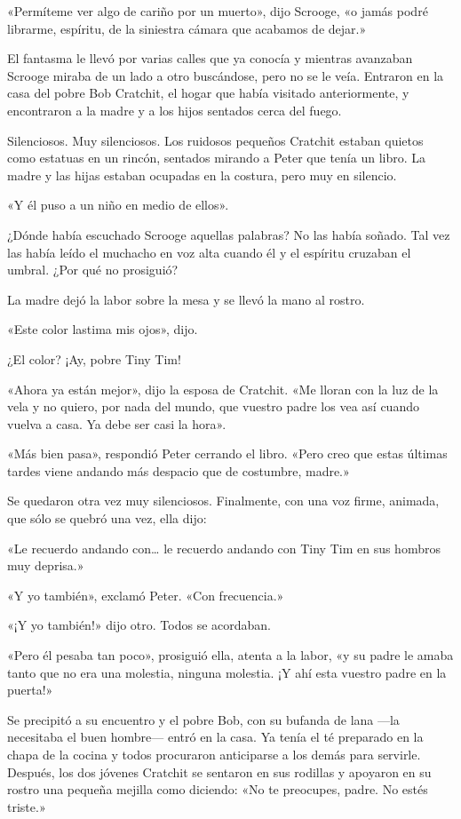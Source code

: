 \documentclass{novela}
\begin{document}
 «Permíteme ver algo de cariño por un muerto», dijo Scrooge, «o jamás podré librarme, espíritu, de la siniestra cámara que acabamos de dejar.»

 El fantasma le llevó por varias calles que ya conocía y mientras avanzaban Scrooge miraba de un lado a otro buscándose, pero no se le veía. Entraron en la casa del pobre Bob Cratchit, el hogar que había visitado anteriormente, y encontraron a la madre y a los hijos sentados cerca del fuego.

 Silenciosos. Muy silenciosos. Los ruidosos pequeños Cratchit estaban quietos como estatuas en un rincón, sentados mirando a Peter que tenía un libro. La madre y las hijas estaban ocupadas en la costura, pero muy en silencio.

 «Y él puso a un niño en medio de ellos».

 ¿Dónde había escuchado Scrooge aquellas palabras? No las había soñado. Tal vez las había leído el muchacho en voz alta cuando él y el espíritu cruzaban el umbral. ¿Por qué no prosiguió?

 La madre dejó la labor sobre la mesa y se llevó la mano al rostro.

 «Este color lastima mis ojos», dijo.

 ¿El color? ¡Ay, pobre Tiny Tim!


 «Ahora ya están mejor», dijo la esposa de Cratchit. «Me lloran con la luz de la vela y no quiero, por nada del mundo, que vuestro padre los vea así cuando vuelva a casa. Ya debe ser casi la hora».

 «Más bien pasa», respondió Peter cerrando el libro. «Pero creo que estas últimas tardes viene andando más despacio que de costumbre, madre.»

 Se quedaron otra vez muy silenciosos. Finalmente, con una voz firme, animada, que sólo se quebró una vez, ella dijo:

 «Le recuerdo andando con{\ldots} le recuerdo andando con Tiny Tim en sus hombros muy deprisa.»

 «Y yo también», exclamó Peter. «Con frecuencia.»

 «¡Y yo también!» dijo otro. Todos se acordaban.

 «Pero él pesaba tan poco», prosiguió ella, atenta a la labor, «y su padre le amaba tanto que no era una molestia, ninguna molestia. ¡Y ahí esta vuestro padre en la puerta!»

 Se precipitó a su encuentro y el pobre Bob, con su bufanda de lana ---la necesitaba el buen hombre--- entró en la casa. Ya tenía el té preparado en la chapa de la cocina y todos procuraron anticiparse a los demás para servirle. Después, los dos jóvenes Cratchit se sentaron en sus rodillas y apoyaron en su rostro una pequeña mejilla como diciendo: «No te preocupes, padre. No estés triste.»
\end{document}
